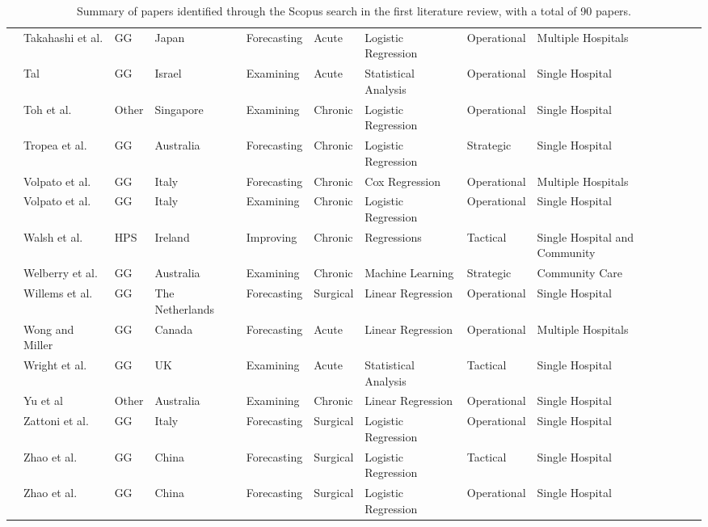 \documentclass[thesis.tex]{subfiles}
\begin{document}
\begin{landscape}
\begin{table}[H]
{\begin{tabular}{@{}llllllllll@{}}
    \cite{Takahashi2011} & Takahashi et al. & GG & Japan & Forecasting & Acute & Logistic Regression & Operational & Multiple Hospitals \\
    \cite{Tal2021} & Tal & GG & Israel & Examining & Acute & Statistical Analysis & Operational & Single Hospital \\
    \cite{Toh2017} & Toh et al. & Other & Singapore & Examining & Chronic & Logistic Regression & Operational & Single Hospital \\ 
    \cite{Tropea2016} & Tropea et al. & GG & Australia & Forecasting & Chronic & Logistic Regression & Strategic & Single Hospital \\
    \cite{Volpato2014} & Volpato et al. & GG & Italy & Forecasting & Chronic & Cox Regression & Operational & Multiple Hospitals\\
    \cite{Volpato2018} & Volpato et al. & GG & Italy & Examining & Chronic & Logistic Regression & Operational & Single Hospital \\
    \cite{Walsh2020} & Walsh et al. & HPS & Ireland & Improving & Chronic & Regressions & Tactical & Single Hospital and Community\\   
  \cite{Welberry}  &Welberry et al.&GG&Australia&Examining&Chronic&Machine Learning&Strategic&Community Care\\
    \cite{Willems2012} & Willems et al.  & GG & The Netherlands & Forecasting & Surgical & Linear Regression & Operational & Single Hospital \\
    \cite{Wong2008} & Wong and Miller & GG & Canada & Forecasting & Acute & Linear Regression & Operational & Multiple Hospitals\\
    \cite{Wright2013} & Wright et al. & GG & UK & Examining & Acute & Statistical Analysis & Tactical & Single Hospital \\
    \cite{Yu2018} & Yu et al & Other & Australia & Examining & Chronic & Linear Regression & Operational & Single Hospital \\
    \cite{Zattoni2018} & Zattoni et al. & GG & Italy &Forecasting & Surgical & Logistic Regression & Operational & Single Hospital \\
    \cite{Zhao2020} & Zhao et al. & GG & China & Forecasting & Surgical & Logistic Regression & Tactical & Single Hospital \\
    \cite{Zhao2020a} & Zhao et al. & GG & China & Forecasting & Surgical & Logistic Regression & Operational & Single Hospital \\

\bottomrule
    \end{tabular}
    }
     \caption{{Summary of papers identified through the Scopus search in the first literature review, with a total of 90 papers.}}
\end{table}
\end{landscape}
\end{document}
